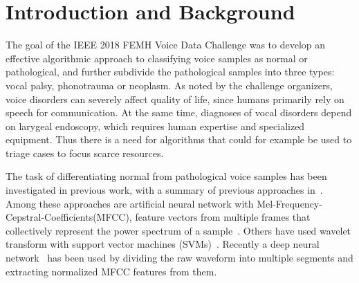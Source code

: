 \section{Introduction and Background}
The goal of the IEEE 2018 FEMH Voice Data Challenge was to develop an effective algorithmic approach to classifying voice samples as normal or pathological, and further subdivide the pathological samples into three types: vocal palsy, phonotrauma or neoplasm. As noted by the challenge organizers, voice disorders can severely affect quality of life, since humans primarily rely on speech for communication. At the same time, diagnoses of vocal disorders depend on larygeal endoscopy, which requires human expertise and specialized equipment. Thus there is a need for algorithms that could for example be used to triage cases to focus scarce resources.

The task of differentiating normal from pathological voice samples has been investigated in previous work, with a summary of previous approaches in~\cite{b9}. Among these approaches are artificial neural network with Mel-Frequency-Cepstral-Coefficients(MFCC), feature vectors from multiple frames that collectively represent the power spectrum of a sample~\cite{b5}. Others have used wavelet transform with support vector machines (SVMs)~\cite{b4}. Recently a deep neural network~\cite{b9} has been used by dividing the raw waveform into multiple segments and extracting normalized MFCC features from them.

